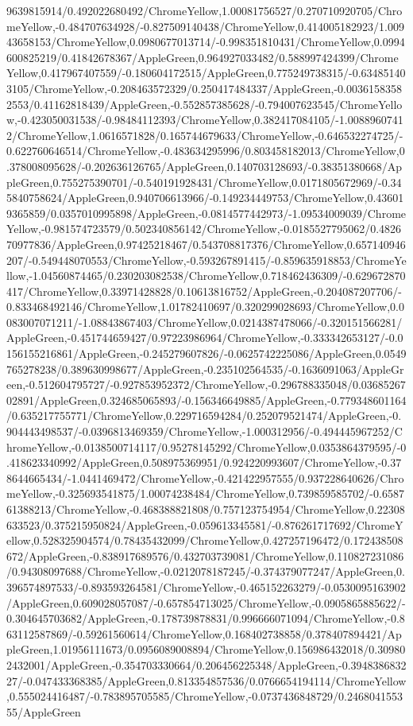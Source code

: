 {\begin{tikzternal}
9639815914/0.492022680492/ChromeYellow,1.00081756527/0.270710920705/ChromeYellow,-0.484707634928/-0.827509140438/ChromeYellow,0.414005182923/1.00943658153/ChromeYellow,0.0980677013714/-0.998351810431/ChromeYellow,0.0994600825219/0.41842678367/AppleGreen,0.964927033482/0.588997424399/ChromeYellow,0.417967407559/-0.180604172515/AppleGreen,0.775249738315/-0.634851403105/ChromeYellow,-0.208463572329/0.250417484337/AppleGreen,-0.00361583582553/0.41162818439/AppleGreen,-0.552857385628/-0.794007623545/ChromeYellow,-0.423050031538/-0.98484112393/ChromeYellow,0.382417084105/-1.00889607412/ChromeYellow,1.0616571828/0.165744679633/ChromeYellow,-0.646532274725/-0.622760646514/ChromeYellow,-0.483634295996/0.803458182013/ChromeYellow,0.378008095628/-0.202636126765/AppleGreen,0.140703128693/-0.38351380668/AppleGreen,0.755275390701/-0.540191928431/ChromeYellow,0.0171805672969/-0.345840758624/AppleGreen,0.940706613966/-0.149234449753/ChromeYellow,0.436019365859/0.0357010995898/AppleGreen,-0.0814577442973/-1.09534009039/ChromeYellow,-0.981574723579/0.502340856142/ChromeYellow,-0.0185527795062/0.482670977836/AppleGreen,0.97425218467/0.543708817376/ChromeYellow,0.657140946207/-0.549448070553/ChromeYellow,-0.593267891415/-0.859635918853/ChromeYellow,-1.04560874465/0.230203082538/ChromeYellow,0.718462436309/-0.629672870417/ChromeYellow,0.33971428828/0.10613816752/AppleGreen,-0.204087207706/-0.833468492146/ChromeYellow,1.01782410697/0.320299028693/ChromeYellow,0.0083007071211/-1.08843867403/ChromeYellow,0.0214387478066/-0.320151566281/AppleGreen,-0.451744659427/0.97223986964/ChromeYellow,-0.333342653127/-0.0156155216861/AppleGreen,-0.245279607826/-0.0625742225086/AppleGreen,0.0549765278238/0.389630998677/AppleGreen,-0.235102564535/-0.1636091063/AppleGreen,-0.512604795727/-0.927853952372/ChromeYellow,-0.296788335048/0.0368526702891/AppleGreen,0.324685065893/-0.156346649885/AppleGreen,-0.779348601164/0.635217755771/ChromeYellow,0.229716594284/0.252079521474/AppleGreen,-0.904443498537/-0.0396813469359/ChromeYellow,-1.000312956/-0.494445967252/ChromeYellow,-0.0138500714117/0.95278145292/ChromeYellow,0.0353864379595/-0.418623340992/AppleGreen,0.508975369951/0.924220993607/ChromeYellow,-0.378644665434/-1.0441469472/ChromeYellow,-0.421422957555/0.937228640626/ChromeYellow,-0.325693541875/1.00074238484/ChromeYellow,0.739859585702/-0.658761388213/ChromeYellow,-0.468388821808/0.757123754954/ChromeYellow,0.22308633523/0.375215950824/AppleGreen,-0.059613345581/-0.876261717692/ChromeYellow,0.528325904574/0.78435432099/ChromeYellow,0.427257196472/0.172438508672/AppleGreen,-0.838917689576/0.432703739081/ChromeYellow,0.110827231086/0.94308097688/ChromeYellow,-0.0212078187245/-0.374379077247/AppleGreen,0.396574897533/-0.893593264581/ChromeYellow,-0.465152263279/-0.0530095163902/AppleGreen,0.609028057087/-0.657854713025/ChromeYellow,-0.0905865885622/-0.304645703682/AppleGreen,-0.178739878831/0.996666071094/ChromeYellow,-0.863112587869/-0.59261560614/ChromeYellow,0.168402738858/0.378407894421/AppleGreen,1.01956111673/0.0956089008894/ChromeYellow,0.156986432018/0.309802432001/AppleGreen,-0.354703330664/0.206456225348/AppleGreen,-0.394838683227/-0.047433368385/AppleGreen,0.813354857536/0.0766654194114/ChromeYellow,0.555024416487/-0.783895705585/ChromeYellow,-0.0737436848729/0.246804155355/AppleGreen
\end{tikzternal}}
